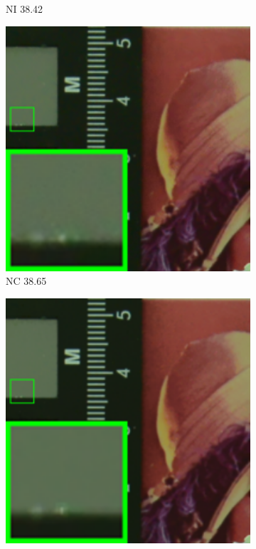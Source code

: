\begin{figure}
\begin{subfigure}[t]{0.19\textwidth}
\caption{NI 38.42}
    \end{subfigure}
\hfill
    \begin{subfigure}[t]{0.19\textwidth}
        \centering
        \includegraphics[width=1\textwidth]{images/mcwnnm/resize_br_NC_CC15_d800_iso1600_2.png}
		\caption{NC 38.65}
    \end{subfigure}
    \hfill
    \begin{subfigure}[t]{0.19\textwidth}
        \centering
        \includegraphics[width=1\textwidth]{images/mcwnnm/resize_br_CC_d800_iso1600_2.png}

\end{subfigure}
\end{figure}
